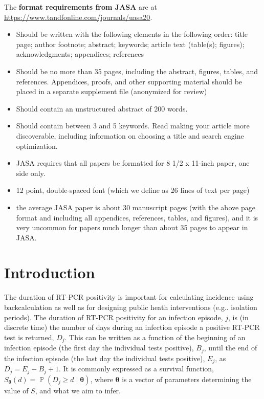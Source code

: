\documentclass[12pt]{article}
\makeatletter
\DeclareMathOperator{\prob}{\mathbb{P}}
\renewcommand{\vec}[1]{\bm{#1}}
\DeclareRobustCommand\onedot{\futurelet\@let@token\@onedot}
\def\@onedot{\ifx\@let@token.\else.\null\fi\xspace}
\def\eg{e.g\onedot} \def\Eg{{E.g}\onedot}
\makeatother
\begin{document}
The \textbf{format requirements from JASA} are at \url{https://www.tandfonline.com/journals/uasa20}.
\begin{itemize}
    \item Should be written with the following elements in the following order: title page; author footnote; abstract; keywords; article text (table(s); figures); acknowledgments; appendices; references
    \item Should be no more than 35 pages, including the abstract, figures, tables, and references. Appendices, proofs, and other supporting material should be placed in a separate supplement file (anonymized for review)
    \item Should contain an unstructured abstract of 200 words.
    \item Should contain between 3 and 5 keywords. Read making your article more discoverable, including information on choosing a title and search engine optimization.
    \item JASA requires that all papers be formatted for 8 1/2 x 11-inch paper, one side only.
    \item 12 point, double-spaced font (which we define as 26 lines of text per page)
    \item the average JASA paper is about 30 manuscript pages (with the above page format and including all appendices, references, tables, and figures), and it is very uncommon for papers much longer than about 35 pages to appear in JASA. 
\end{itemize}

\tableofcontents

\newpage
{} %
\section{Introduction} \label{sec:intro}

The duration of RT-PCR positivity is important for calculating incidence using backcalculation as well as for designing public heath interventions (\eg isolation periods).
The duration of RT-PCR positivity for an infection episode, $j$, is (in discrete time) the number of days during an infection episode a positive RT-PCR test is returned, $D_j$.
This can be written as a function of the beginning of an infection episode (the first day the individual tests positive), $B_j$, until the end of the infection episode (the last day the individual tests positive), $E_j$, as $D_j = E_j - B_j + 1$.
It is commonly expressed as a survival function, $S_{\vec{\theta}}(d) = \prob(D_j \geq d \mid \vec{\theta})$, where $\vec{\theta}$ is a vector of parameters determining the value of $S$, and what we aim to infer.
\end{document}
